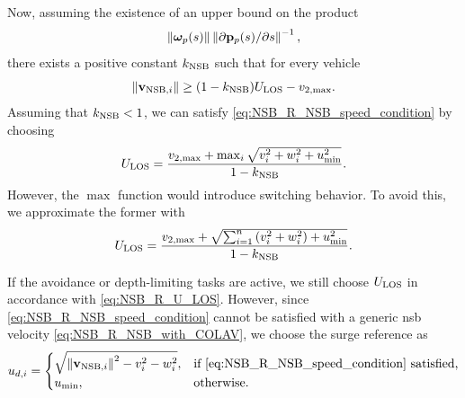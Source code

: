 Now, assuming the existence of an upper bound on the product $$\left\|\bm{\omega}_p(s)\right\|\left\|\partial \mathbf{p}_p(s) / \partial s\right\|^{-1},$$ there exists a positive constant $k_{\rm NSB}$ such that for every vehicle 
\begin{equation}
    \left\|\mathbf{v}_{{\rm NSB}, i}\right\| \geq (1 - k_{\rm NSB})U_{\rm LOS} - v_{2, \max}.
\end{equation}
Assuming that $k_{\rm NSB} < 1$, we can satisfy \eqref{eq:NSB_R_NSB_speed_condition} by choosing 
\begin{equation}
    U_{\rm LOS} = \frac{v_{2, \max} + \max_i \sqrt{v_i^2 + w_i^2 + u_{\min}^2}}{1 - k_{\rm NSB}}.
\end{equation}
However, the $\max$ function would introduce switching behavior.
To avoid this, we approximate the former with 
\begin{equation}
    U_{\rm LOS} = \frac{v_{2, \max} + \sqrt{\sum_{i=1}^n \left(v_i^2 + w_i^2\right) + u_{\min}^2}}{1 - k_{\rm NSB}}.
    \label{eq:NSB_R_U_LOS}
\end{equation}


If the avoidance or depth-limiting tasks are active, we still choose $U_{\rm LOS}$ in accordance with \eqref{eq:NSB_R_U_LOS}.
However, since \eqref{eq:NSB_R_NSB_speed_condition} cannot be satisfied with a generic \gls{nsb} velocity \eqref{eq:NSB_R_NSB_with_COLAV}, we choose the surge reference as 
\begin{equation}
    u_{d, i} = 
    \begin{cases}
        \sqrt{\left\|\mathbf{v}_{{\rm NSB}, i}\right\|^2 - v_i^2 - w_i^2},  &\text{if \eqref{eq:NSB_R_NSB_speed_condition} satisfied,} \\
        u_{\rm min}, &\text{otherwise}.
    \end{cases}
\end{equation}


